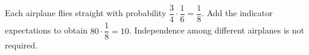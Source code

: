 Each airplane flies straight with probability $\dfrac{3}{4}\cdot\dfrac{1}{6}=\dfrac{1}{8}$. Add the indicator expectations to obtain $80\cdot\dfrac{1}{8}=\boxed{10}$. Independence among different airplanes is not required.
